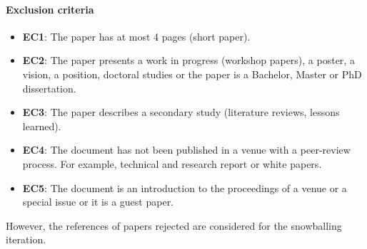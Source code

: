\paragraph{Exclusion criteria}
\begin{itemize}
	\item \textbf{EC1}: The paper has at most 4 pages (short paper).
	\item \textbf{EC2}: The paper presents a work in progress (workshop papers), a poster, a vision, a position, doctoral studies or the paper is a Bachelor, Master or PhD dissertation.
	\item \textbf{EC3}: The paper describes a secondary study (\eg literature reviews, lessons learned).
	\item \textbf{EC4}: The document has not been published in a venue with a peer-review process. For example, technical and research report or white papers.
	\item \textbf{EC5}: The document is an introduction to the proceedings of a venue or a special issue or it is a guest paper.
\end{itemize}

However, the references of papers rejected are considered for the snowballing iteration.